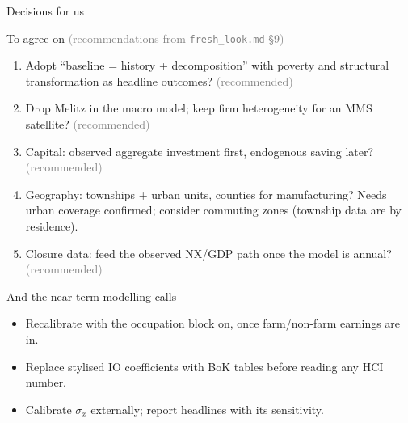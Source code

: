\documentclass[10pt,aspectratio=169]{beamer}
\newcommand{\mute}[1]{\textcolor{gray}{#1}}
\begin{document}
\begin{frame}{Decisions for us}
  \small
  \begin{block}{To agree on \mute{\normalfont\scriptsize(recommendations from \texttt{fresh\_look.md} \S9)}}
    \begin{enumerate}
      \item Adopt ``baseline = history + decomposition'' with poverty and structural
            transformation as headline outcomes? \mute{(recommended)}
      \item Drop Melitz in the macro model; keep firm heterogeneity for an MMS satellite?
            \mute{(recommended)}
      \item Capital: observed aggregate investment first, endogenous saving later?
            \mute{(recommended)}
      \item Geography: townships + urban units, counties for manufacturing? Needs urban
            coverage confirmed; consider commuting zones (township data are by residence).
      \item Closure data: feed the observed NX/GDP path once the model is annual?
            \mute{(recommended)}
    \end{enumerate}
  \end{block}
  \begin{alertblock}{And the near-term modelling calls}
    \begin{itemize}
      \item Recalibrate with the occupation block on, once farm/non-farm earnings are in.
      \item Replace stylised IO coefficients with BoK tables before reading any HCI number.
      \item Calibrate $\sigma_x$ externally; report headlines with its sensitivity.
    \end{itemize}
  \end{alertblock}
\end{frame}
\end{document}
